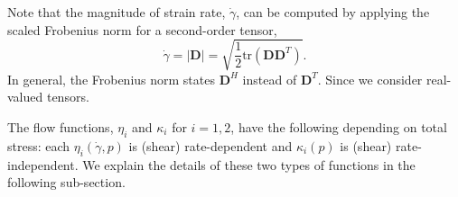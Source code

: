 Note that the magnitude of strain rate, $\dot{\gamma}$, can be computed by applying the scaled Frobenius norm for a second-order tensor, 
\[
  \dot{\gamma}  = |\bm{D}| = \sqrt{\frac{1}{2}
    \text{tr}\left(\bm{D} \bm{D}^{T} \right)}.
\]
In general, the Frobenius norm states $\bm{D}^H$ instead of $\bm{D}^T$. Since we consider real-valued tensors.
\par
The flow functions, $\eta_i$ and $\kappa_i$ for $i = 1,2$, have the following depending on total stress: each $\eta_i(\dot{\gamma}, p)$ is (shear) rate-dependent and $\kappa_i (p)$ is (shear) rate-independent. 
We explain the details of these two types of functions in the following sub-section.

